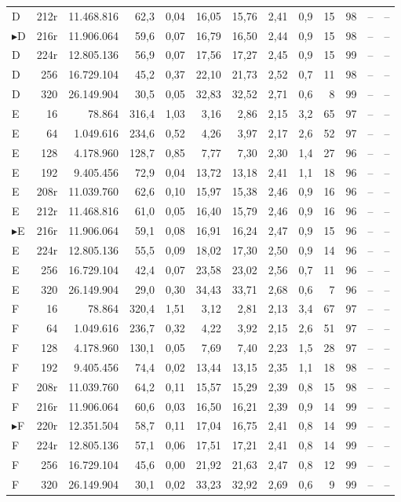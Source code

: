 {\begin{longtable}{l r r r r r r r r r r r r}
D & 212r & 11.468.816 & 62,3 & 0,04 & 16,05 & 15,76 & 2,41 & 0,9 & 15 & 98 & -- & -- \\
$\blacktriangleright$D & 216r & 11.906.064 & 59,6 & 0,07 & 16,79 & 16,50 & 2,44 & 0,9 & 15 & 98 & -- & -- \\
D & 224r & 12.805.136 & 56,9 & 0,07 & 17,56 & 17,27 & 2,45 & 0,9 & 15 & 99 & -- & -- \\
D & 256 & 16.729.104 & 45,2 & 0,37 & 22,10 & 21,73 & 2,52 & 0,7 & 11 & 98 & -- & -- \\
D & 320 & 26.149.904 & 30,5 & 0,05 & 32,83 & 32,52 & 2,71 & 0,6 & 8 & 99 & -- & -- \\
\midrule
E & 16 & 78.864 & 316,4 & 1,03 & 3,16 & 2,86 & 2,15 & 3,2 & 65 & 97 & -- & -- \\
E & 64 & 1.049.616 & 234,6 & 0,52 & 4,26 & 3,97 & 2,17 & 2,6 & 52 & 97 & -- & -- \\
E & 128 & 4.178.960 & 128,7 & 0,85 & 7,77 & 7,30 & 2,30 & 1,4 & 27 & 96 & -- & -- \\
E & 192 & 9.405.456 & 72,9 & 0,04 & 13,72 & 13,18 & 2,41 & 1,1 & 18 & 96 & -- & -- \\
E & 208r & 11.039.760 & 62,6 & 0,10 & 15,97 & 15,38 & 2,46 & 0,9 & 16 & 96 & -- & -- \\
E & 212r & 11.468.816 & 61,0 & 0,05 & 16,40 & 15,79 & 2,46 & 0,9 & 16 & 96 & -- & -- \\
$\blacktriangleright$E & 216r & 11.906.064 & 59,1 & 0,08 & 16,91 & 16,24 & 2,47 & 0,9 & 15 & 96 & -- & -- \\
E & 224r & 12.805.136 & 55,5 & 0,09 & 18,02 & 17,30 & 2,50 & 0,9 & 14 & 96 & -- & -- \\
E & 256 & 16.729.104 & 42,4 & 0,07 & 23,58 & 23,02 & 2,56 & 0,7 & 11 & 96 & -- & -- \\
E & 320 & 26.149.904 & 29,0 & 0,30 & 34,43 & 33,71 & 2,68 & 0,6 & 7 & 96 & -- & -- \\
\midrule
F & 16 & 78.864 & 320,4 & 1,51 & 3,12 & 2,81 & 2,13 & 3,4 & 67 & 97 & -- & -- \\
F & 64 & 1.049.616 & 236,7 & 0,32 & 4,22 & 3,92 & 2,15 & 2,6 & 51 & 97 & -- & -- \\
F & 128 & 4.178.960 & 130,1 & 0,05 & 7,69 & 7,40 & 2,23 & 1,5 & 28 & 97 & -- & -- \\
F & 192 & 9.405.456 & 74,4 & 0,02 & 13,44 & 13,15 & 2,35 & 1,1 & 18 & 98 & -- & -- \\
F & 208r & 11.039.760 & 64,2 & 0,11 & 15,57 & 15,29 & 2,39 & 0,8 & 15 & 98 & -- & -- \\
F & 216r & 11.906.064 & 60,6 & 0,03 & 16,50 & 16,21 & 2,39 & 0,9 & 14 & 99 & -- & -- \\
$\blacktriangleright$F & 220r & 12.351.504 & 58,7 & 0,11 & 17,04 & 16,75 & 2,41 & 0,8 & 14 & 99 & -- & -- \\
F & 224r & 12.805.136 & 57,1 & 0,06 & 17,51 & 17,21 & 2,41 & 0,8 & 14 & 99 & -- & -- \\
F & 256 & 16.729.104 & 45,6 & 0,00 & 21,92 & 21,63 & 2,47 & 0,8 & 12 & 99 & -- & -- \\
F & 320 & 26.149.904 & 30,1 & 0,02 & 33,23 & 32,92 & 2,69 & 0,6 & 9 & 99 & -- & -- \\
\bottomrule
\end{longtable}
}
